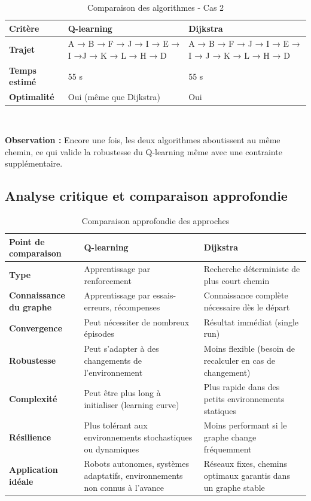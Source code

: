 \documentclass{article}
\begin{document}
\begin{table}[H]
    \begin{tabularx}{\linewidth}{|X|X|X|}
        \hline
        \textbf{Critère} & \textbf{Q-learning} & \textbf{Dijkstra} \\
        \hline
        \textbf{Trajet} & A → B → F → J → I → E → I →J → K → L → H → D & A → B → F → J → I → E → I → J → K → L → H → D \\
        \hline
        \textbf{Temps estimé} & 55 s & 55 s \\
        \hline
        \textbf{Optimalité} & Oui (même que Dijkstra) & Oui \\
        \hline
    \end{tabularx} \\
  \caption{Comparaison des algorithmes - Cas 2}
\vspace{0.25cm} 
\hspace{1cm} 
\textbf{Observation :} Encore une fois, les deux algorithmes aboutissent au même chemin, ce qui valide la robustesse du Q-learning même avec une contrainte supplémentaire.
  
\end{table}


\subsection{Analyse critique et comparaison approfondie}
\begin{table}[H]
    \centering
    \begin{tabularx}{\linewidth}{|X|X|X|}
        \hline
        \textbf{Point de comparaison} & \textbf{Q-learning} & \textbf{Dijkstra} \\
        \hline
        \textbf{Type} & Apprentissage par renforcement & Recherche déterministe de plus court chemin \\
   	\hline
        \textbf{Connaissance du graphe} & Apprentissage par essais-erreurs, récompenses & Connaissance complète nécessaire dès le départ \\
   	\hline
        \textbf{Convergence} & Peut nécessiter de nombreux épisodes & Résultat immédiat (single run) \\
  	 \hline
        \textbf{Robustesse} & Peut s'adapter à des changements de l'environnement & Moins flexible (besoin de recalculer en cas de changement) \\
  	 \hline
        \textbf{Complexité} & Peut être plus long à initialiser (learning curve) & Plus rapide dans des petits environnements statiques \\
  	 \hline
        \textbf{Résilience} & Plus tolérant aux environnements stochastiques ou dynamiques & Moins performant si le graphe change fréquemment \\
   	\hline
        \textbf{Application idéale} & Robots autonomes, systèmes adaptatifs, environnements non connus à l'avance & Réseaux fixes, chemins optimaux garantis dans un graphe stable \\
        \hline
    \end{tabularx}
    \caption{Comparaison approfondie des approches}
\end{table}
\end{document}
